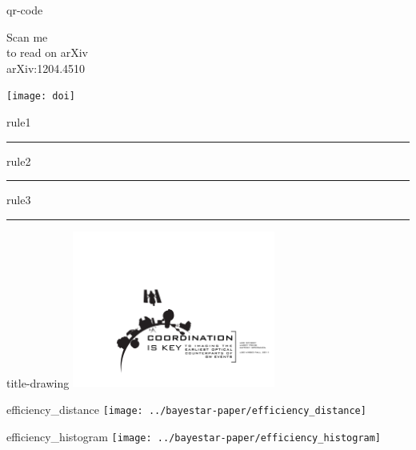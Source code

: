 \documentclass[landscape]{a0poster}
\begin{document}
\begin{staticcontents*}{qr-code}
\begin{minipage}[b]{12cm}%
\raggedleft%
{\Huge Scan me} \\
\vspace{0.25cm}
\Large{to read on arXiv} \\
\Large{arXiv:1204.4510} \\
\vspace{0.1cm}
\end{minipage}%
\hspace{1cm}%
\texttt{[image: doi]}
\end{staticcontents*}

\begin{staticcontents*}{rule1}
\centering\rule{1pt}{66cm}
\end{staticcontents*}

\begin{staticcontents*}{rule2}
\rule{55cm}{1pt}
\end{staticcontents*}

\begin{staticcontents*}{rule3}
\centering\rule{1pt}{80cm}
\end{staticcontents*}

\begin{staticcontents*}{title-drawing}
\includegraphics[width=0.5\textwidth]{title-drawing.pdf}
\end{staticcontents*}

\begin{staticcontents*}{efficiency_distance}
\texttt{[image: ../bayestar-paper/efficiency\_distance]}
\end{staticcontents*}

\begin{staticcontents*}{efficiency_histogram}
\texttt{[image: ../bayestar-paper/efficiency\_histogram]}
\end{staticcontents*}
\end{document}
